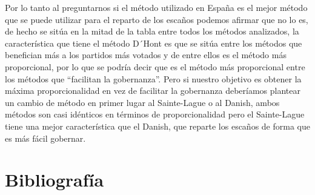 \documentclass[12pt,a4paper,]{book}
\def\ifdoblecara{} %
\def\ifcitapandoc{} %
\let\ifcitapandoc\undefined %
\numberwithin{dummy}{section}
\theoremstyle{ocrenumbox}
\theoremstyle{blacknumex}
\theoremstyle{blacknumbox}
\theoremstyle{ocrenum}
\theoremstyle{ocrenum}
\begin{document}
Por lo tanto al preguntarnos si el método utilizado en España es el
mejor método que se puede utilizar para el reparto de los escaños
podemos afirmar que no lo es, de hecho se sitúa en la mitad de la tabla
entre todos los métodos analizados, la característica que tiene el
método D´Hont es que se sitúa entre los métodos que benefician más a los
partidos más votados y de entre ellos es el método más proporcional, por
lo que se podría decir que es el método más proporcional entre los
métodos que ``facilitan la gobernanza''. Pero si nuestro objetivo es
obtener la máxima proporcionalidad en vez de facilitar la gobernanza
deberíamos plantear un cambio de método en primer lugar al Sainte-Lague
o al Danish, ambos métodos son casi idénticos en términos de
proporcionalidad pero el Sainte-Lague tiene una mejor característica que
el Danish, que reparte los escaños de forma que es más fácil gobernar.

\FloatBarrier
\cleardoublepage

\ifdefined\ifdoblecara
  \fancyhead[LE,RO]{}
  \fancyfoot[LO,RE]{}
\else
  \fancyhead[RO]{}
  \fancyfoot[LO]{}
\fi

\ifdefined\ifcitapandoc

\hypertarget{bibliografuxeda}{%
\chapter*{Bibliografía}\label{bibliografuxeda}}

\else

\nocite{*}

\fi




\end{document}
